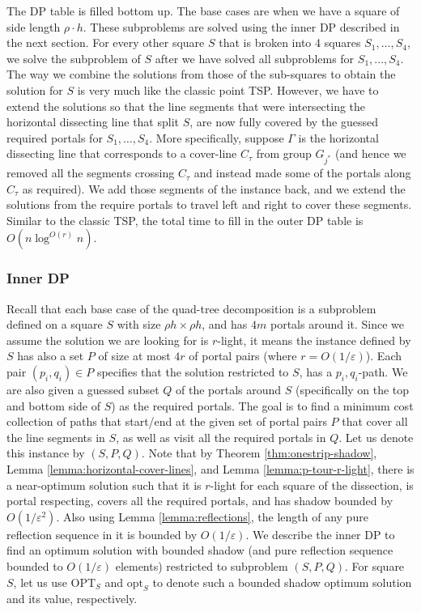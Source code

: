 \documentclass[10pt,a4paper]{amsart}
\theoremstyle{thmstyleone}
\newcommand{\eps}{\varepsilon}
\newcommand{\opt}{{\text{opt}}}
\newcommand{\OPT}{{\text{OPT}}}
\begin{document}
The DP table is filled bottom up. The base cases are when we have a square of side length $\rho\cdot h$.
These subproblems are solved using the inner DP described in the next section.
For every other square $S$ that is broken into 4 squares $S_1,\ldots,S_4$, we solve the subproblem of $S$
after we have solved all subproblems for $S_1,\ldots,S_4$.
The way we combine the solutions from those of the sub-squares to obtain the solution for $S$ is very much like
the classic point TSP. However, we have to extend the solutions so that the line segments that were intersecting the horizontal dissecting line that split $S$, are now fully covered by the guessed required portals for $S_1,\ldots,S_4$.
More specifically, suppose $\Gamma$ is the horizontal dissecting line that corresponds to a cover-line $C_\tau$ from group $G_{j^*}$ (and hence we removed all the segments crossing $C_\tau$ and instead made some of the portals along $C_\tau$ as required). We add those segments of the instance back, and we extend the solutions from the require portals to travel left and right to cover these segments.
Similar to the classic TSP, the total time to fill in the outer DP table is $O(n \log^{O(r)} n)$.

\subsubsection{Inner DP}\label{sec:inner-dp}
Recall that each base case of the quad-tree decomposition is a subproblem defined 
on a square $S$ with size $\rho h \times \rho h$, and has $4m$ portals around it.
Since we assume the solution we are looking for is $r$-light, it means the instance defined by $S$ has also
a set $P$ of size at most $4r$ of portal pairs (where $r=O(1/\eps)$). Each pair $(p_i,q_i)\in P$ specifies that the solution restricted to $S$, has a $p_i,q_i$-path. We are also given a guessed subset $Q$ of the portals around $S$ (specifically  on the top and bottom side of $S$) as the required portals. The goal is to find a minimum cost collection of paths that start/end at the given set of portal pairs $P$ that cover all the line segments in $S$, as well as visit all the required portals in $Q$. Let us denote this instance by $(S,P,Q)$. Note
that by Theorem \ref{thm:onestrip-shadow}, Lemma \ref{lemma:horizontal-cover-lines}, and Lemma \ref{lemma:p-tour-r-light}, there is a near-optimum solution such that it is $r$-light for each square of the dissection, is portal respecting, covers all the required portals, and has shadow bounded by $O(1/\eps^2)$. Also using Lemma \ref{lemma:reflections}, the length
of any pure reflection sequence in it is bounded by $O(1/\eps)$. We describe the inner DP to find 
an optimum solution with bounded shadow (and pure reflection sequence bounded to $O(1/\eps)$ elements) restricted
to subproblem $(S,P,Q)$. For square $ S $, let us use $\OPT_S$ and $\opt_S$ to denote such a bounded shadow optimum solution and its value, respectively.
\end{document}
